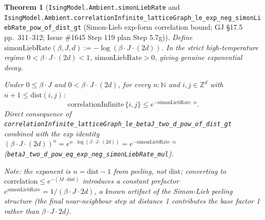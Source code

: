 \documentclass[a4paper,11pt]{article}
\newtheorem{theorem}{Theorem}
\begin{document}
\begin{theorem}[\texttt{IsingModel.Ambient.simonLiebRate} and
\texttt{IsingModel.Ambient.correlationInfinite\_latticeGraph\_le\_exp\_neg\_simonLiebRate\_pow\_of\_dist\_gt}
(Simon-Lieb exp-form correlation bound;
GJ \S17.5 pp.~311--312; Issue \#1645 Step 119 plan Step 5.7g)]
Define
$\mathrm{simonLiebRate}(\beta, J, d) := -\log(\beta\cdot J\cdot(2d))$.
In the strict high-temperature regime $0 < \beta\cdot J\cdot(2d) < 1$,
$\mathrm{simonLiebRate} > 0$, giving genuine exponential decay.

Under $0 \le \beta\cdot J$ and $0 < \beta\cdot J\cdot(2d)$, for every
$n : \mathbb{N}$ and $i, j \in \mathbb{Z}^d$ with $n + 1 \le \mathrm{dist}(i, j)$:
\[
  \mathrm{correlationInfinite}\,\{i, j\}
    \le e^{-\mathrm{simonLiebRate}\cdot n}.
\]
Direct consequence of
\texttt{correlationInfinite\_latticeGraph\_le\_betaJ\_two\_d\_pow\_of\_dist\_gt}
combined with the exp identity
$(\beta\cdot J\cdot(2d))^n = e^{n\cdot\log(\beta\cdot J\cdot(2d))}
= e^{-\mathrm{simonLiebRate}\cdot n}$
(\texttt{betaJ\_two\_d\_pow\_eq\_exp\_neg\_simonLiebRate\_mul}).

Note: the exponent is $n = \mathrm{dist} - 1$ from peeling, not
$\mathrm{dist}$; converting to $\mathrm{correlation} \le e^{-(M\cdot\mathrm{dist})}$
introduces a constant prefactor $e^{\mathrm{simonLiebRate}} = 1/(\beta\cdot J\cdot 2d)$,
a known artifact of the Simon-Lieb peeling structure (the final
near-neighbour step at distance 1 contributes the base factor 1 rather
than $\beta\cdot J\cdot 2d$).
\end{theorem}
\end{document}
